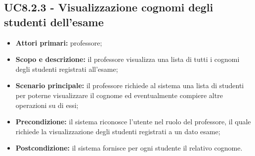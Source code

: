 \documentclass[AnalisiDeiRequisiti.tex]{subfiles}
\begin{document}
\subsection{UC8.2.3 - Visualizzazione cognomi degli studenti dell'esame}
\begin{itemize}
	\item \textbf{Attori primari:} professore;
	\item \textbf{Scopo e descrizione:} il professore visualizza una lista di tutti i cognomi degli studenti registrati all'esame;
	\item \textbf{Scenario principale:} il professore richiede al sistema una lista di studenti per poterne visualizzare il cognome ed eventualmente compiere altre operazioni su di essi;
	\item \textbf{Precondizione:} il sistema riconosce l'utente nel ruolo del professore, il quale richiede la visualizzazione degli studenti registrati a un dato esame;
	\item \textbf{Postcondizione:} il sistema fornisce per ogni studente il relativo cognome.
\end{itemize}
\end{document}
